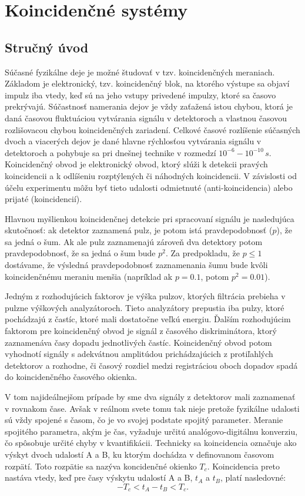 \documentclass[../../main.tex]{subfiles}
\begin{document}
\chapter{Koincidenčné systémy}

\section{Stručný úvod}
Súčasné fyzikálne deje je možné študovať v tzv. koincidenčných meraniach. Základom je elektronický, tzv. koincidenčný blok, na ktorého výstupe sa objaví impulz iba vtedy, keď sú na jeho vstupy privedené impulzy, ktoré sa časovo prekrývajú. Súčastnosť namerania dejov je vždy zaťažená istou chybou, ktorá je daná časovou fluktuáciou vytvárania signálu v detektoroch a vlastnou časovou rozlišovacou chybou koincidenčných zariadení. Celkové časové rozlíšenie súčasných dvoch a viacerých dejov je dané hlavne rýchlosťou vytvárania signálu v detektoroch a pohybuje sa pri dnešnej technike v rozmedzí $10^{-6} - 10^{-10}\,s$. Koincidenčný obvod je elektronický obvod, ktorý slúži k detekcii pravých koincidencii a k odlíšeniu rozptýlených či náhodných koincidencii. V závislosti od účelu experimentu môžu byť tieto udalosti odmietnuté (anti-koincidencia) alebo prijaté (koincidencií).

Hlavnou myšlienkou koincidenčnej detekcie pri spracovaní signálu je nasledujúca skutočnosť: ak detektor zaznamená pulz, je potom istá pravdepodobnosť ($p$), že sa jedná o šum. Ak ale pulz zaznamenajú zároveň dva detektory potom pravdepodobnosť, že sa jedná o šum bude $p^2$. Za predpokladu, že $p \leq 1$ dostávame, že výsledná pravdepodobnosť zaznamenania šumu bude kvôli koincidenčnému meraniu menšia (napríklad ak $p=0.1$, potom $p^2=0.01$).

Jedným z rozhodujúcich faktorov je výška pulzov, ktorých filtrácia prebieha v pulzne výškových analyzátoroch. Tieto analyzátory prepustia iba pulzy, ktoré pochádzajú z častíc, ktoré mali dostatočne veľkú energiu. Ďalším rozhodujúcim faktorom pre koincidenčný obvod je signál z časového diskriminátora, ktorý zaznamenáva časy dopadu jednotlivých častíc. Koincidenčný obvod potom vyhodnotí signály s adekvátnou amplitúdou prichádzajúcich z protiľahlých detektorov a rozhodne, či časový rozdiel medzi registráciou oboch dopadov spadá do koincidenčného časového okienka. 

V tom najideálnejšom prípade by sme dva signály z detektorov mali zaznamenať v rovnakom čase. Avšak v reálnom svete tomu tak nieje pretože fyzikálne udalosti sú vždy spojené s časom, čo je vo svojej podstate spojitý parameter. Meranie spojitého parametra, akým je čas, vyžaduje určitú analógovo-digitálnu konverziu, čo spôsobuje určité chyby v kvantifikácii. Technicky sa koincidencia označuje ako výskyt dvoch udalostí A a B, ku ktorým dochádza v definovanom časovom rozpätí. Toto rozpätie sa nazýva koncidenčné okienko $T_c$. Koincidencia preto nastáva vtedy, keď pre časy výskytu udalostí A a B, $t_A$ a $t_B$, platí nasledovné:
$$ -T_c < t_A-t_B < T_c.$$
\end{document}
